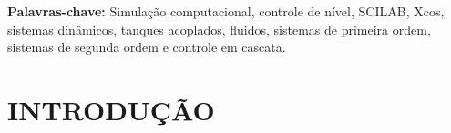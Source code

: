\documentclass[a4paper,12pt]{article}
\begin{document}
\vspace{1cm}

\textbf{Palavras-chave:} Simulação computacional, controle de nível, SCILAB, Xcos, sistemas dinâmicos, tanques acoplados, 
fluidos, sistemas de primeira ordem, sistemas de segunda ordem e controle em cascata.


\newpage




\begin{center}
\tableofcontents
\end{center}

\newpage


\thispagestyle{main}

\section{INTRODUÇÃO}\hspace{4ex}
\end{document}
